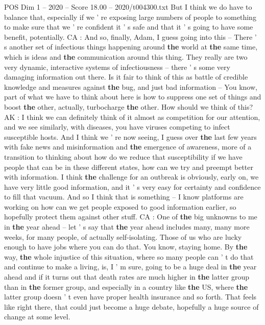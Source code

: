 \begin{textsample}{POS Dim 1 – 2020 – Score 18.00 – 2020/t004300.txt}
But I think we do have to balance that, especially if we ' re exposing large numbers of people to something to make sure that we ' re confident it ' s safe and that it ' s going to have some benefit, potentially.
CA : And so, finally, Adam, I guess going into this -- There ' s another set of infectious things happening around \textbf{the} world at \textbf{the} same time, which is ideas and \textbf{the} communication around this thing.
They really are two very dynamic, interactive systems of infectiousness -- there ' s some very damaging information out there.
Is it fair to think of this as battle of credible knowledge and measures against \textbf{the} bug, and just bad information -- You know, part of what we have to think about here is how to suppress one set of things and boost \textbf{the} other, actually, turbocharge \textbf{the} other.
How should we think of this?
AK : I think we can definitely think of it almost as competition for our attention, and we see similarly, with diseases, you have viruses competing to infect susceptible hosts.
And I think we ' re now seeing, I guess over \textbf{the} last few years with fake news and misinformation and \textbf{the} emergence of awareness, more of a transition to thinking about how do we reduce that susceptibility if we have people that can be in these different states, how can we try and preempt better with information.
I think \textbf{the} challenge for an outbreak is obviously, early on, we have very little good information, and it ' s very easy for certainty and confidence to fill that vacuum.
And so I think that is something -- I know platforms are working on how can we get people exposed to good information earlier, so hopefully protect them against other stuff.
CA : One of \textbf{the} big unknowns to me in \textbf{the} year ahead -- let ' s say that \textbf{the} year ahead includes many, many more weeks, for many people, of actually self-isolating.
Those of us who are lucky enough to have jobs where you can do that.
You know, staying home.
By \textbf{the} way, \textbf{the} whole injustice of this situation, where so many people can ' t do that and continue to make a living, is, I ' m sure, going to be a huge deal in \textbf{the} year ahead and if it turns out that death rates are much higher in \textbf{the} latter group than in \textbf{the} former group, and especially in a country like \textbf{the} US, where \textbf{the} latter group doesn ' t even have proper health insurance and so forth.
That feels like right there, that could just become a huge debate, hopefully a huge source of change at some level.

\end{textsample}
